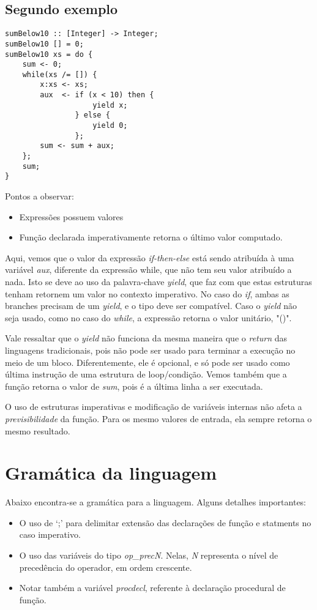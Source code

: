 \documentclass[11pt]{article}
\begin{document}
\subsection{Segundo exemplo}

\begin{lstlisting}[basicstyle=\small]
sumBelow10 :: [Integer] -> Integer;
sumBelow10 [] = 0;
sumBelow10 xs = do {
    sum <- 0;
    while(xs /= []) {
        x:xs <- xs;
        aux  <- if (x < 10) then {
                    yield x;
                } else {
                    yield 0;
                };
        sum <- sum + aux;
    };
    sum;
}
\end{lstlisting}

Pontos a observar:
\begin{itemize}[leftmargin=.5in]
\item Expressões possuem valores
\item Função declarada imperativamente retorna o último valor computado.
\end{itemize}


Aqui, vemos que o valor da expressão \emph{if-then-else} está sendo atribuída à uma variável 
\emph{aux}, diferente da expressão while, que não tem seu valor atribuído a nada.
Isto se deve ao uso da palavra-chave \emph{yield}, que faz com que estas estruturas tenham retornem 
um valor no contexto imperativo. No caso do \emph{if}, ambas as branches precisam
de um \emph{yield}, e o tipo deve ser compatível.
Caso o \emph{yield} não seja usado, como no caso do \emph{while}, a expressão retorna o valor 
unitário, "()".

Vale ressaltar que o \emph{yield} não funciona da mesma maneira que o \emph{return} das linguagens 
tradicionais, pois não pode ser usado para terminar a execução no meio de um bloco.
Diferentemente, ele é opcional, e só pode ser usado como última instrução de uma estrutura de 
loop/condição.
Vemos também que a função retorna o valor de \emph{sum}, pois é a última linha a ser executada.


O uso de estruturas imperativas e modificação de variáveis 
internas não afeta a 
\emph{previsibilidade} da função. Para os mesmo valores de 
entrada, ela sempre retorna o mesmo 
resultado.

\section{Gramática da linguagem}

Abaixo encontra-se a gramática para a linguagem. Alguns detalhes importantes:
\begin{itemize}[leftmargin=.5in]
\item O uso de `;' para delimitar extensão das declarações de
função e statments no caso imperativo. 
\item O uso das variáveis 
do tipo \emph{op\_precN}. Nelas, \emph{N} representa o nível de 
precedência do operador, em ordem crescente. 
\item Notar também a variável \emph{procdecl}, referente à declaração procedural de função.
\end{itemize}
\end{document}
